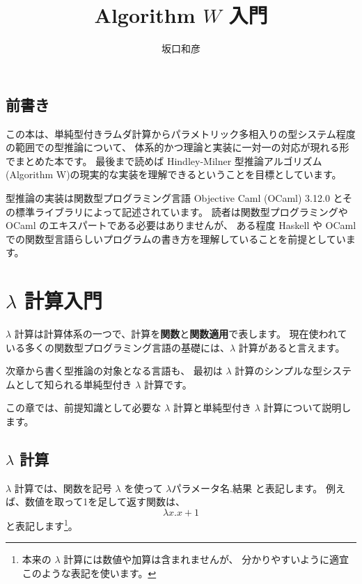 \documentclass[b5paper]{jsbook}
\title{Algorithm $W$ 入門}
\author{坂口和彦}
\begin{document}
\maketitle


\section*{前書き}

この本は、単純型付きラムダ計算からパラメトリック多相入りの型システム程度の範囲での型推論について、
体系的かつ理論と実装に一対一の対応が現れる形でまとめた本です。
最後まで読めば Hindley-Milner 型推論アルゴリズム(Algorithm W)の現実的な実装を理解できるということを目標としています。

型推論の実装は関数型プログラミング言語 Objective Caml (OCaml) 3.12.0
とその標準ライブラリによって記述されています。
読者は関数型プログラミングや OCaml のエキスパートである必要はありませんが、
ある程度 Haskell や OCaml での関数型言語らしいプログラムの書き方を理解していることを前提としています。

\tableofcontents

\newpage


\chapter{$\lambda$ 計算入門}

$\lambda$ 計算は計算体系の一つで、計算を\textbf{関数}と\textbf{関数適用}で表します。
現在使われている多くの関数型プログラミング言語の基礎には、$\lambda$ 計算があると言えます。

次章から書く型推論の対象となる言語も、
最初は $\lambda$ 計算のシンプルな型システムとして知られる単純型付き $\lambda$ 計算です。

この章では、前提知識として必要な $\lambda$ 計算と単純型付き $\lambda$ 計算について説明します。

\section{$\lambda$ 計算}

$\lambda$ 計算では、関数を記号 $\lambda$ を使って
$\lambda \text{パラメータ名} . \text{結果}$ と表記します。
例えば、数値を取って1を足して返す関数は、
\[ \lambda x. x+1 \]
と表記します\footnote{本来の $\lambda$ 計算には数値や加算は含まれませんが、
分かりやすいように適宜このような表記を使います。}。
\end{document}
